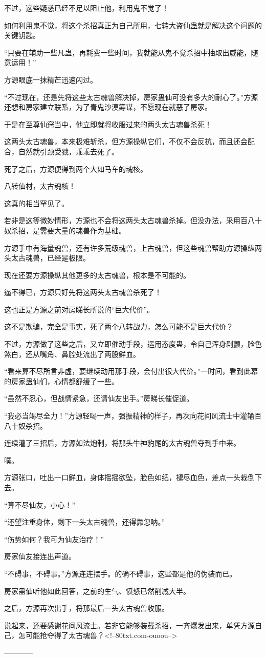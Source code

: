 \begin{this_body}
不过，这些疑惑已经不足以阻止他，利用鬼不觉了！

如何利用鬼不觉，将这个杀招真正为自己所用，七转大盗仙蛊就是解决这个问题的关键钥匙。

“只要在辅助一些凡蛊，再耗费一些时间，我就能从鬼不觉杀招中抽取出威能，随意运用！”

方源眼底一抹精芒迅速闪过。

“不过现在，还是先将这些太古魂兽解决掉，房家蛊仙可没有多大的耐心了。”方源还想和房家建立联系，为了青鬼沙漠筹谋，不愿现在就恶了房家。

于是在至尊仙窍当中，他立即就将收服过来的两头太古魂兽杀死！

这两头太古魂兽，本来极难斩杀，但方源操纵它们，不仅不会反抗，而且还会配合，自然就引颈受戮，乖乖去死了。

死了之后，方源便得到两个大如马车的魂核。

八转仙材，太古魂核！

这真的相当罕见了。

若非是这等微妙情形，方源也不会将这两头太古魂兽杀掉。但没办法，采用百八十奴杀招，是需要大量的魂兽作为基础。

方源手中有海量魂兽，还有许多荒级魂兽，上古魂兽，但这些魂兽帮助方源操纵两头太古魂兽，已经是极限。

现在还要方源操纵其他更多的太古魂兽，根本是不可能的。

逼不得已，方源只好先将这两头太古魂兽杀死了！

这也正是方源之前对房睇长所说的“巨大代价”。

这不是欺骗，完全是事实，死了两个八转战力，怎么可能不是巨大代价？

不过，方源做了这些之后，又立即催动手段，运用态度蛊，令自己浑身剧颤，脸色煞白，还从嘴角、鼻腔处流出了两股鲜血。

“看来算不尽所言非虚，要继续动用那手段，会付出很大代价。”一时间，看到此幕的房家蛊仙们，心情都舒缓了一些。

“虽然不忍心，但战情紧急，还请仙友出手。”房睇长催促道。

“我必当竭尽全力！”方源轻喝一声，强振精神的样子，再次向花间风流士中灌输百八十奴杀招。

连续灌了三招后，方源如法炮制，将那头牛神豹尾的太古魂兽夺到手中来。

噗。

方源张口，吐出一口鲜血，身体摇摇欲坠，脸色如纸，褪尽血色，差点一头栽倒下去。

“算不尽仙友，小心！”

“还望注重身体，剩下一头太古魂兽，还得靠您呐。”

“伤势如何？我可为仙友治疗！”

房家仙友接连出声道。

“不碍事，不碍事。”方源连连摆手。的确不碍事，这些都是他的伪装而已。

房家蛊仙听他如此回答，之前的生气、愤怒已然削减大半。

之后，方源再次出手，将那最后一头太古魂兽收服。

说起来，还要感谢花间风流士。若非它能够装载杀招，一齐爆发出来，单凭方源自己，怎可能抢夺得了太古魂兽？<!--80txt.com-ouoou-->

------------

\end{this_body}

